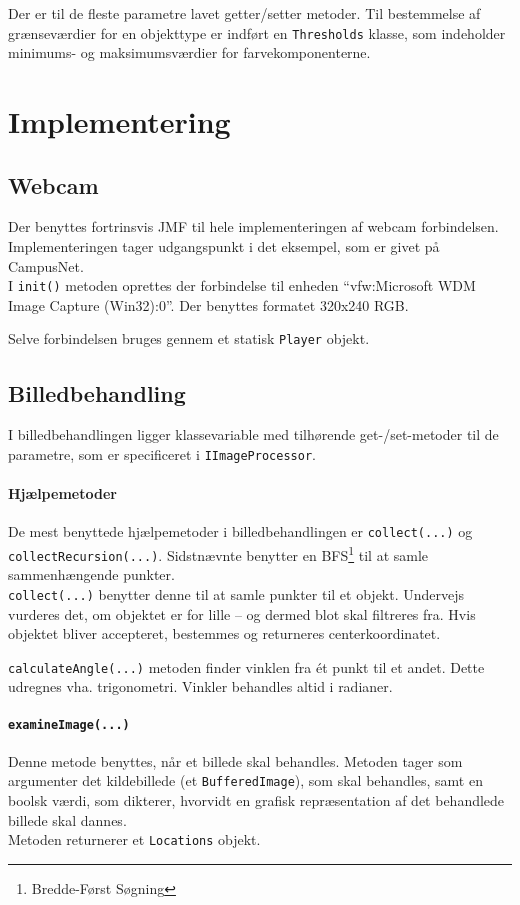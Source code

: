 Der er til de fleste parametre lavet getter/setter metoder. Til bestemmelse af grænseværdier for en objekttype er indført en \texttt{Thresholds} klasse, som indeholder minimums- og maksimumsværdier for farvekomponenterne.

\section{Implementering}
\subsection{Webcam}
Der benyttes fortrinsvis JMF til hele implementeringen af webcam forbindelsen. Implementeringen tager udgangspunkt i det eksempel, som er givet på CampusNet. \\
I \texttt{init()} metoden oprettes der forbindelse til enheden "`vfw:Microsoft WDM Image Capture (Win32):0"'. Der benyttes formatet 320x240 RGB.

Selve forbindelsen bruges gennem et statisk \texttt{Player} objekt.

\subsection{Billedbehandling}
I billedbehandlingen ligger klassevariable med tilhørende get-/set-metoder til de parametre, som er specificeret i \texttt{IImageProcessor}.

\paragraph{Hjælpemetoder}
De mest benyttede hjælpemetoder i billedbehandlingen er \texttt{collect(...)} og \texttt{collectRecursion(...)}. Sidstnævnte benytter en BFS\footnote{Bredde-Først Søgning} til at samle sammenhængende punkter.\\
\texttt{collect(...)} benytter denne til at samle punkter til et objekt. Undervejs vurderes det, om objektet er for lille -- og dermed blot skal filtreres fra. Hvis objektet bliver accepteret, bestemmes og returneres centerkoordinatet.

\texttt{calculateAngle(...)} metoden finder vinklen fra ét punkt til et andet. Dette udregnes vha. trigonometri. Vinkler behandles altid i radianer.

\paragraph{\texttt{examineImage(...)}}
Denne metode benyttes, når et billede skal behandles. Metoden tager som argumenter det kildebillede (et \texttt{BufferedImage}), som skal behandles, samt en boolsk værdi, som dikterer, hvorvidt en grafisk repræsentation af det behandlede billede skal dannes.\\
Metoden returnerer et \texttt{Locations} objekt.

